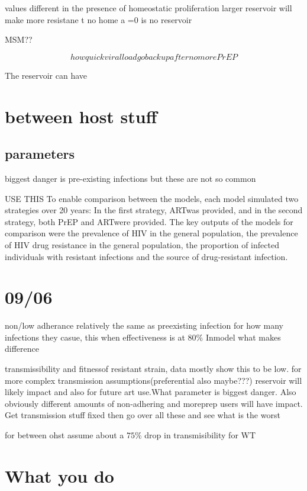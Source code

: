 \documentclass[DIV=15]{scrartcl}
\begin{document}
values different in the presence of  homeostatic proliferation larger reservoir will make more resistane t
 no home a =0 is no reservoir

MSM??




$$how quick viral load go back up after no more PrEP$$

The reservoir can have 


\section{between host stuff}
   \subsection{parameters}
biggest danger is pre-existing infections but these are not so common


  
USE THIS
To enable comparison between the models, each model
simulated two strategies over 20 years: In the first strategy,
ARTwas provided, and in the second strategy, both PrEP
and ARTwere provided. The key outputs of the models
for comparison were the prevalence of HIV in the general
population, the prevalence of HIV drug resistance in
the general population, the proportion of infected
individuals with resistant infections and the source of
drug-resistant infection.


\section{09/06}
non/low adherance relatively the same as preexisting infection for how many infections they casue, this when effectiveness is at $ 80\%$
Inmodel what makes difference 

transmissibility and fitnessof resistant strain, data mostly show this to be low.  for more complex transmission assumptions(preferential also maybe???) reservoir will likely impact and also for future art use.What parameter is biggest danger. Also obviously different amounts of non-adhering and moreprep users will have impact. Get transmission stuff fixed then go over all these and see what is the worst

 
 
 for between ohst assume about a $75\% $ drop in transmisibility for WT~\cite{partners2012}
 
 
 
 
 \section{What you do}
 
\end{document}
